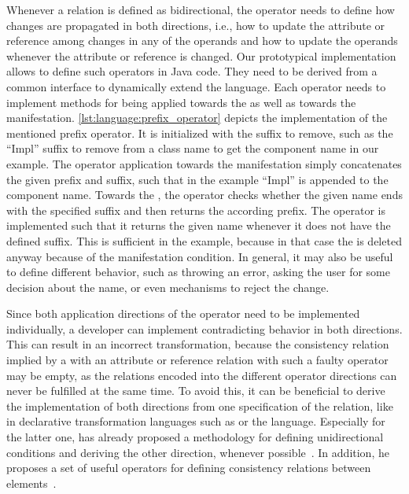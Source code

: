Whenever a relation is defined as bidirectional, the operator needs to define how changes are propagated in both directions, i.e., how to update the \commonality attribute or reference among changes in any of the operands and how to update the operands whenever the \commonality attribute or reference is changed.
Our prototypical implementation allows to define such operators in Java code.
They need to be derived from a common interface to dynamically extend the language.
Each operator needs to implement methods for being applied towards the \commonality as well as towards the manifestation.
\autoref{lst:language:prefix_operator} depicts the implementation of the mentioned prefix operator.
It is initialized with the suffix to remove, such as the \enquote{Impl} suffix to remove from a class name to get the component name in our example.
The operator application towards the manifestation simply concatenates the given prefix and suffix, such that in the example \enquote{Impl} is appended to the component name.
Towards the \commonality, the operator checks whether the given name ends with the specified suffix and then returns the according prefix.
The operator is implemented such that it returns the given name whenever it does not have the defined suffix.
This is sufficient in the example, because in that case the \commonality is deleted anyway because of the manifestation condition.
In general, it may also be useful to define different behavior, such as throwing an error, asking the user for some decision about the name, or even mechanisms to reject the change.

Since both application directions of the operator need to be implemented individually, a developer can implement contradicting behavior in both directions.
This can result in an incorrect transformation, because the consistency relation implied by a \commonality with an attribute or reference relation with such a faulty operator may be empty, as the relations encoded into the different operator directions can never be fulfilled at the same time.
To avoid this, it can be beneficial to derive the implementation of both directions from one specification of the relation, like in declarative transformation languages such as \qvtr or the \mappings language.
Especially for the latter one, \citeauthor{kramer2017a} has already proposed a methodology for defining unidirectional conditions and deriving the other direction, whenever possible~\cite[Sec. 7.4]{kramer2017a}.
In addition, he proposes a set of useful operators for defining consistency relations between elements~\cite[Sec. 7.3]{kramer2017a}.

